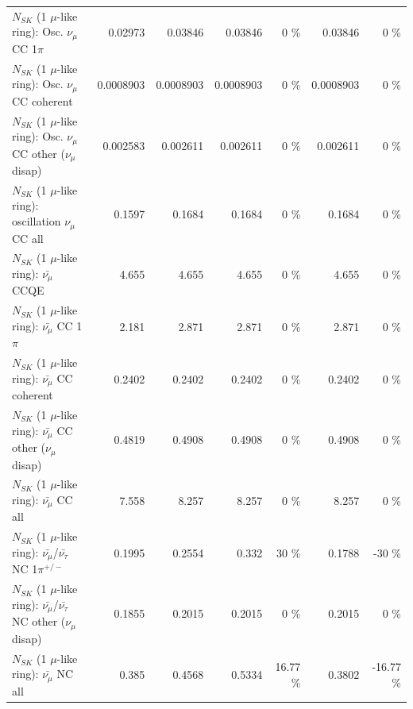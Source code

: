 \begin{table}
\begin{tabular}{| l | r | r | r  r | r  r |}
                          $N_{SK}$ (1 $\mu$-like ring): Osc. $\nu_\mu$ CC 1$\pi$ &         0.02973 &         0.03846 &         0.03846 &        0 \%  &         0.03846 &        0 \%  \\ 
                        $N_{SK}$ (1 $\mu$-like ring): Osc. $\nu_\mu$ CC coherent &       0.0008903 &       0.0008903 &       0.0008903 &        0 \%  &       0.0008903 &        0 \%  \\ 
         $N_{SK}$ (1 $\mu$-like ring): Osc. $\nu_\mu$ CC other ($\nu_\mu$ disap) &        0.002583 &        0.002611 &        0.002611 &        0 \%  &        0.002611 &        0 \%  \\ 
                      $N_{SK}$ (1 $\mu$-like ring): oscillation $\nu_\mu$ CC all &          0.1597 &          0.1684 &          0.1684 &        0 \%  &          0.1684 &        0 \%  \\ 
\hline
\hline
                              $N_{SK}$ (1 $\mu$-like ring): $\bar{\nu_\mu}$ CCQE &           4.655 &           4.655 &           4.655 &        0 \%  &           4.655 &        0 \%  \\ 
                         $N_{SK}$ (1 $\mu$-like ring): $\bar{\nu_\mu}$ CC 1$\pi$ &           2.181 &           2.871 &           2.871 &        0 \%  &           2.871 &        0 \%  \\ 
                       $N_{SK}$ (1 $\mu$-like ring): $\bar{\nu_\mu}$ CC coherent &          0.2402 &          0.2402 &          0.2402 &        0 \%  &          0.2402 &        0 \%  \\ 
        $N_{SK}$ (1 $\mu$-like ring): $\bar{\nu_\mu}$ CC other ($\nu_\mu$ disap) &          0.4819 &          0.4908 &          0.4908 &        0 \%  &          0.4908 &        0 \%  \\ 
                          $N_{SK}$ (1 $\mu$-like ring): $\bar{\nu_{\mu}}$ CC all &           7.558 &           8.257 &           8.257 &        0 \%  &           8.257 &        0 \%  \\ 
\hline
  $N_{SK}$ (1 $\mu$-like ring): $\bar{\nu_\mu}$/$\bar{\nu_\tau}$ NC 1$\pi^{+/-}$ &          0.1995 &          0.2554 &           0.332 &       30 \%  &          0.1788 &      -30 \%  \\ 
$N_{SK}$ (1 $\mu$-like ring): $\bar{\nu_\mu}$/$\bar{\nu_\tau}$ NC other ($\nu_\mu$ disap) &          0.1855 &          0.2015 &          0.2015 &        0 \%  &          0.2015 &        0 \%  \\ 
                          $N_{SK}$ (1 $\mu$-like ring): $\bar{\nu_{\mu}}$ NC all &           0.385 &          0.4568 &          0.5334 &    16.77 \%  &          0.3802 &   -16.77 \%  \\ 

\end{tabular}
\end{table}
